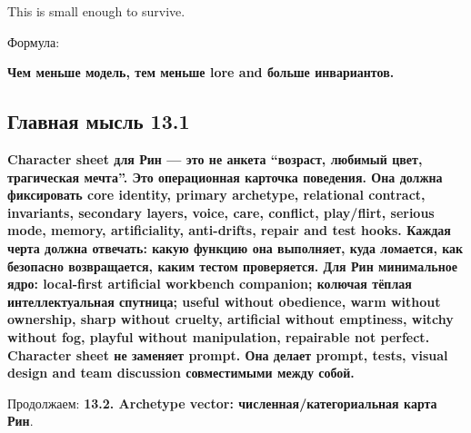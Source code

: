 This is small enough to survive.

Формула:

\textbf{Чем меньше модель, тем меньше lore and больше инвариантов.}

\subsection*{Главная мысль 13.1}

\textbf{Character sheet для Рин --- это не анкета ``возраст, любимый
цвет, трагическая мечта''. Это операционная карточка поведения. Она
должна фиксировать core identity, primary archetype, relational
contract, invariants, secondary layers, voice, care, conflict,
play/\hspace{0pt}flirt, serious mode, memory, artificiality, anti-drifts, repair and
test hooks. Каждая черта должна отвечать: какую функцию она выполняет,
куда ломается, как безопасно возвращается, каким тестом проверяется. Для
Рин минимальное ядро: local-first artificial workbench companion;
колючая тёплая интеллектуальная спутница; useful without obedience, warm
without ownership, sharp without cruelty, artificial without emptiness,
witchy without fog, playful without manipulation, repairable not
perfect. Character sheet не заменяет prompt. Она делает prompt, tests,
visual design and team discussion совместимыми между собой.}

Продолжаем: \textbf{13.2. Archetype vector: численная/\hspace{0pt}категориальная
карта Рин}.
